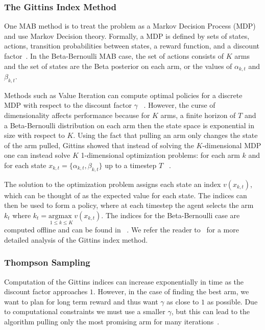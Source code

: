 \documentclass[10pt, conference]{ieeeconf}      %
\begin{document}

\subsubsection{The Gittins Index Method} 
One MAB method is to treat the problem as a Markov Decision Process (MDP) and use Markov Decision theory.
Formally, a MDP is defined by sets of states, actions, transition probabilities between states, a reward function, and a discount factor~\cite{barto1998reinforcement}.
In the Beta-Bernoulli MAB case, the set of actions consists of $K$ arms and the set of states are the Beta posterior on each arm, or the values of $\alpha_{k,t}$ and $\beta_{k,t}$. 

Methods such as Value Iteration can compute optimal policies for a discrete MDP with respect to the discount factor $\gamma$ ~\cite{barto1998reinforcement}.
However, the curse of dimensionality affects performance because for $K$ arms, a finite horizon of $T$ and a Beta-Bernoulli distribution on each arm then the state space is exponential in size with respect to $K$.
Using the fact that pulling an arm only changes the state of the arm pulled, Gittins showed that instead of solving the $K$-dimensional MDP one can instead solve $K$ 1-dimensional optimization problems: for each arm $k$ and for each state $x_{k,t} = \lbrace \alpha_{k,t}, \beta_{k,t} \rbrace$ up to a timestep $T$ ~\cite{weber1992gittins}. 

The solution to the optimization problem assigns each state an index $v(x_{k,t})$, which can be thought of as the expected value for each state. 
The indices can then be used to form a policy, where at each timestep the agent selects the arm $k_t$ where $k_t= \underset{1 \leq k \leq K}{\mbox{argmax }} v(x_{k,t})$.  The indices for the Beta-Bernoulli case are computed offline and can be found in ~\cite{gittins2011multi}.
We refer the reader to~\cite{gittins2011multi} for a more detailed analysis of the Gittins index method.
 

\subsubsection{Thompson Sampling}
Computation of the Gittins indices can increase exponentially in time as the discount factor approaches $1$.
However, in the case of finding the best arm, we want to plan for long term reward and thus want $\gamma$ as close to $1$ as possible.
Due to computational constraints we must use a smaller $\gamma$, but this can lead to the algorithm pulling only the most promising arm for many iterations~\cite{kelly1981multi}.
\end{document}
